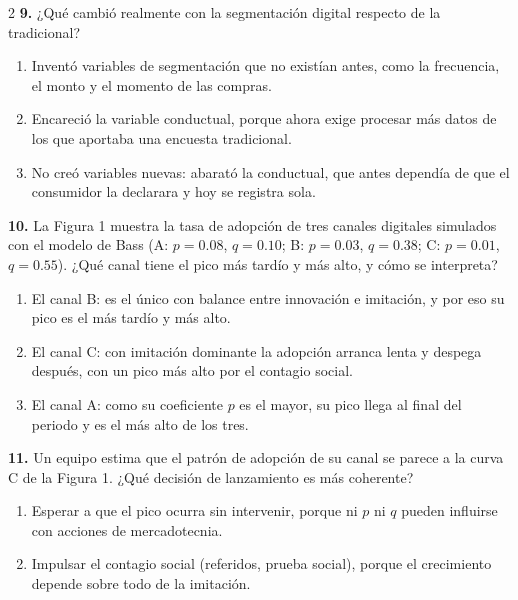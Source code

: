 \documentclass[10pt,letterpaper]{article}
\begin{document}
\begin{multicols}{2}
\vspace{2pt}
\noindent\textbf{9.} ¿Qué cambió realmente con la segmentación digital respecto de la tradicional?
\vspace{-3pt}
\begin{enumerate}[label=\alph*),leftmargin=1.1em,itemsep=0pt,topsep=1pt,parsep=0pt,partopsep=0pt]
\item Inventó variables de segmentación que no existían antes, como la frecuencia, el monto y el momento de las compras.
\item Encareció la variable conductual, porque ahora exige procesar más datos de los que aportaba una encuesta tradicional.
\item No creó variables nuevas: abarató la conductual, que antes dependía de que el consumidor la declarara y hoy se registra sola.
\end{enumerate}
\vspace{2pt}
\noindent\textbf{10.} La Figura 1 muestra la tasa de adopción de tres canales digitales simulados con el modelo de Bass (A: $p=0.08$, $q=0.10$; B: $p=0.03$, $q=0.38$; C: $p=0.01$, $q=0.55$). ¿Qué canal tiene el pico más tardío y más alto, y cómo se interpreta?
\vspace{-3pt}
\begin{enumerate}[label=\alph*),leftmargin=1.1em,itemsep=0pt,topsep=1pt,parsep=0pt,partopsep=0pt]
\item El canal B: es el único con balance entre innovación e imitación, y por eso su pico es el más tardío y más alto.
\item El canal C: con imitación dominante la adopción arranca lenta y despega después, con un pico más alto por el contagio social.
\item El canal A: como su coeficiente $p$ es el mayor, su pico llega al final del periodo y es el más alto de los tres.
\end{enumerate}
\vspace{2pt}
\noindent\textbf{11.} Un equipo estima que el patrón de adopción de su canal se parece a la curva C de la Figura 1. ¿Qué decisión de lanzamiento es más coherente?
\vspace{-3pt}
\begin{enumerate}[label=\alph*),leftmargin=1.1em,itemsep=0pt,topsep=1pt,parsep=0pt,partopsep=0pt]
\item Esperar a que el pico ocurra sin intervenir, porque ni $p$ ni $q$ pueden influirse con acciones de mercadotecnia.
\item Impulsar el contagio social (referidos, prueba social), porque el crecimiento depende sobre todo de la imitación.

\end{enumerate}
\end{multicols}
\end{document}
